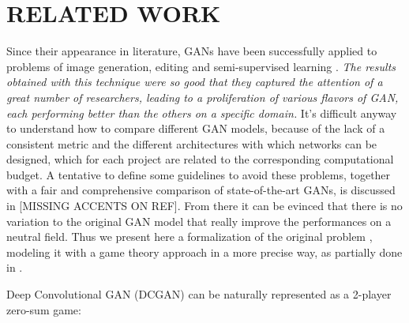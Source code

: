 \section{RELATED WORK} \label{relatedwork}

Since their appearance in literature, GANs have been successfully applied to problems of image generation, editing and semi-supervised learning \cite{DBLP:journals/corr/RadfordMC15} \cite{DBLP:journals/corr/ZhangXLZHWM16}. \textit{The results obtained with this technique were so good that they captured the attention of a great number of researchers, leading to a proliferation of various flavors of GAN, each performing better than the others on a specific domain.} It's difficult anyway to understand how to compare different GAN models, because of the lack of a consistent metric and the different architectures with which networks can be designed, which for each project are related to the corresponding computational budget. A tentative to define some guidelines to avoid these problems, together with a fair and comprehensive comparison of state-of-the-art GANs, is discussed in \cite{46506}[MISSING ACCENTS ON REF]. From there it can be evinced that there is no variation to the original GAN model that really improve the performances on a neutral field. Thus we present here a formalization of the original problem \cite{NIPS2014_5423}, modeling it with a game theory approach in a more precise way, as partially done in \cite{2017arXiv171200679O}.

Deep Convolutional GAN (DCGAN) can be naturally represented as a 2-player zero-sum game: